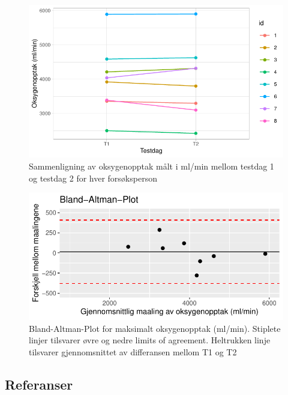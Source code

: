 \documentclass[
  letterpaper,
  DIV=11,
  numbers=noendperiod]{scrartcl}
\begin{document}
\begin{figure}

{\centering \includegraphics{Arbeidskrav-1_files/figure-pdf/fig-test-1.pdf}

}

\caption{\label{fig-test}Sammenligning av oksygenopptak målt i ml/min
mellom testdag 1 og testdag 2 for hver forsøksperson}

\end{figure}

\begin{figure}

{\centering \includegraphics{Arbeidskrav-1_files/figure-pdf/fig-bland-1.pdf}

}

\caption{\label{fig-bland}Bland-Altman-Plot for maksimalt oksygenopptak
(ml/min). Stiplete linjer tilsvarer øvre og nedre limits of agreement.
Heltrukken linje tilsvarer gjennomsnittet av differansen mellom T1 og
T2}

\end{figure}

\newpage

\hypertarget{referanser}{%
\subsection*{Referanser}\label{referanser}}
\end{document}
